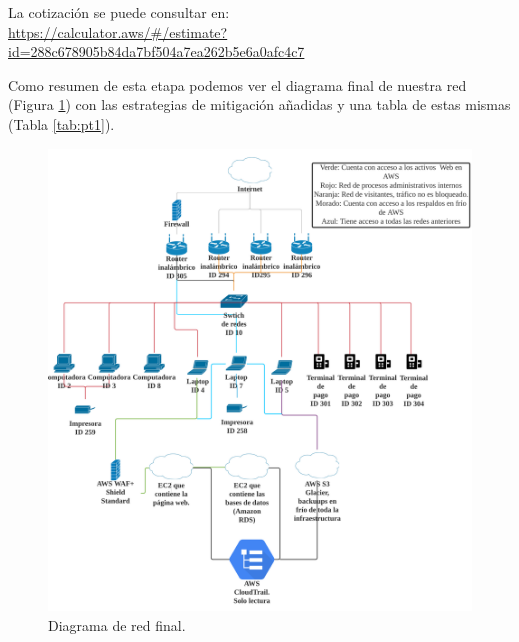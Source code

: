 \documentclass[10pt]{article}
\begin{document}
La cotización se puede consultar en:\\
\url{https://calculator.aws/#/estimate?id=288c678905b84da7bf504a7ea262b5e6a0afc4c7}


Como resumen de esta etapa podemos ver el diagrama final de nuestra red (Figura \ref{fig:diag_final}) con las estrategias de mitigación añadidas y una tabla de estas mismas (Tabla \ref{tab:pt1}).

\begin{figure}[H]
    \centering
    \includegraphics[width=1\textwidth]{imagenes/Diagrama_Final.png}
    \caption{Diagrama de red final.}
    \label{fig:diag_final}
\end{figure}

\clearpage
\end{document}
